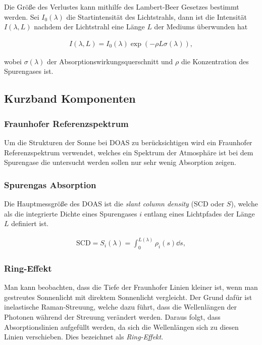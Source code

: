 \documentclass[12pt, a4paper, bibliography=totoc]{scrartcl}
\begin{document}
\begin{multicols}{2}
Die Größe des Verlustes kann mithilfe des Lambert-Beer Gesetzes bestimmt werden.
Sei $I_0 (\lambda)$ die Startintensität des Lichtstrahls, dann ist die Intensität $I(\lambda, L)$ nachdem der Lichtstrahl eine Länge $L$ der Mediums überwunden hat
    
\begin{align}
    I(\lambda, L) = I_0 (\lambda) \exp \left( - \rho L \sigma (\lambda)\right) ,\label{eq:lambert_beer_law}
\end{align}

wobei $\sigma (\lambda)$ der Absorptionswirkungsquerschnitt und $\rho$ die Konzentration des Spurengases ist.

\subsection{Kurzband Komponenten}\label{ssec:Kurzband}

\subsubsection{Fraunhofer Referenzspektrum}\label{sssec:fraunhofer_reference}

Um die Strukturen der Sonne bei DOAS zu berücksichtigen wird ein Fraunhofer Referenzspektrum verwendet, welches ein Spektrum der Atmosphäre ist bei dem Spurengase die untersucht werden sollen nur sehr wenig Absorption zeigen.

\subsubsection{Spurengas Absorption}\label{sssec:trace_gas_absorption}

Die Hauptmessgröße des DOAS ist die \textit{slant column density} (SCD oder $S$),
welche als die integrierte Dichte eines Spurengases $i$ entlang eines Lichtpfades der Länge $L$ definiert ist.
    
\begin{align}
    \text{SCD} = S_i (\lambda) = \int_0^{L(\lambda)} \rho_i (s) \dd s ,\label{eq:SCD}
\end{align}

\subsubsection{Ring-Effekt}

Man kann beobachten, dass die Tiefe der Fraunhofer Linien kleiner ist, wenn man gestreutes Sonnenlicht mit direktem Sonnenlicht vergleicht.
Der Grund dafür ist inelastische Raman-Streuung, welche dazu führt, dass die Wellenlängen der Photonen während der Streuung verändert werden.
Daraus folgt, dass Absorptionslinien aufgefüllt werden, da sich die Wellenlängen sich zu diesen Linien verschieben. 
Dies bezeichnet als \textit{Ring-Effekt}.


\end{multicols}
\end{document}

